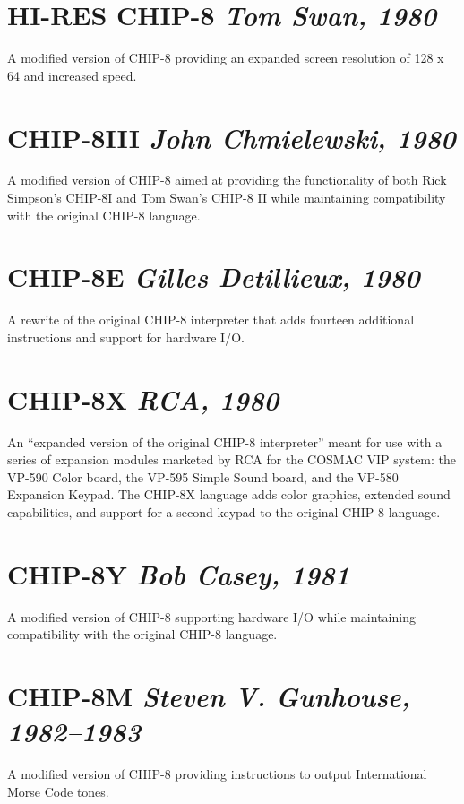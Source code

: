 \documentclass{article}
\newcommand{\subtitle}[1] {{\hfill \small{\emph{#1}}}}
\begin{document}
\begin{multicols}{2}
\section*{HI-RES CHIP-8 \subtitle{Tom Swan, 1980}}
A modified version of CHIP-8 providing an expanded screen resolution of 128 x 64 and increased speed. \cite{hires}

\section*{CHIP-8III \subtitle{John Chmielewski, 1980}}
A modified version of CHIP-8 aimed at providing the functionality of both Rick Simpson's CHIP-8I and Tom Swan's CHIP-8 II while maintaining compatibility with the original CHIP-8 language. \cite{chip8iii}

\section*{CHIP-8E \subtitle{Gilles Detillieux, 1980}}
A rewrite of the original CHIP-8 interpreter that adds fourteen additional instructions and support for hardware I/O. \cite{chip8e}

\section*{CHIP-8X \subtitle{RCA, 1980}}
An ``expanded version of the original CHIP-8 interpreter'' meant for use with a series of expansion modules marketed by RCA for the COSMAC VIP system: the VP-590 Color board, the VP-595 Simple Sound board, and the VP-580 Expansion Keypad. The CHIP-8X language adds color graphics, extended sound capabilities, and support for a second keypad to the original CHIP-8 language. \cite{gamemanual, chip8x}

\section*{CHIP-8Y \subtitle{Bob Casey, 1981}}
A modified version of CHIP-8 supporting hardware I/O while maintaining compatibility with the original CHIP-8 language. \cite{chip8y}

\section*{CHIP-8M \subtitle{Steven V. Gunhouse, 1982--1983}}
A modified version of CHIP-8 providing instructions to output International Morse Code tones. \cite{chip8m}


\end{multicols}
\end{document}

